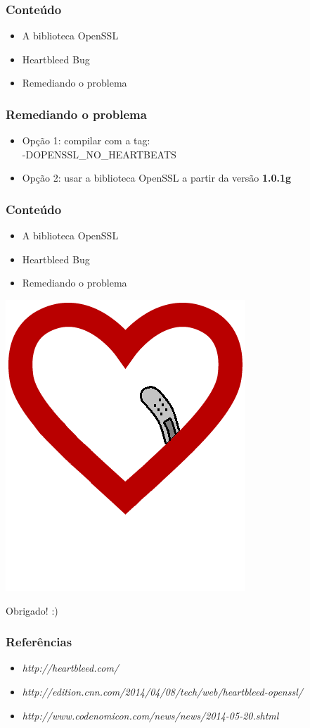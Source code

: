 \documentclass{beamer}
\begin{document}
\begin{frame}
	\frametitle{Conteúdo}
	\begin{itemize}
		\item \textcolor{covered}{A biblioteca OpenSSL}
		\item \textcolor{covered}{Heartbleed Bug}
		\item Remediando o problema
	\end{itemize}
\end{frame}

\begin{frame}
	\frametitle{Remediando o problema}
	\begin{itemize}
		\item Opção 1: compilar com a tag:\\ \hspace{5 mm}-DOPENSSL\_NO\_HEARTBEATS
		\item Opção 2: usar a biblioteca OpenSSL a partir da versão \textbf{1.0.1g}
	\end{itemize}
\end{frame}

\begin{frame}
	\frametitle{Conteúdo}
	\begin{itemize}
		\item \textcolor{covered}{A biblioteca OpenSSL}
		\item \textcolor{covered}{Heartbleed Bug}
		\item \textcolor{covered}{Remediando o problema}
	\end{itemize}
\end{frame}

\begin{frame}
\begin{center}
	\includegraphics[scale=0.4]{heartcured.png}
	\begin{center} 
		Obrigado! :)
	\end{center}
\end{center}
\end{frame}

\begin{frame}
	\frametitle{Referências}
	\begin{itemize}
		\item \textit{http://heartbleed.com/}
		\item \textit{http://edition.cnn.com/2014/04/08/tech/web/heartbleed-openssl/}
		\item \textit{http://www.codenomicon.com/news/news/2014-05-20.shtml}
	\end{itemize}
\end{frame}
\end{document}
